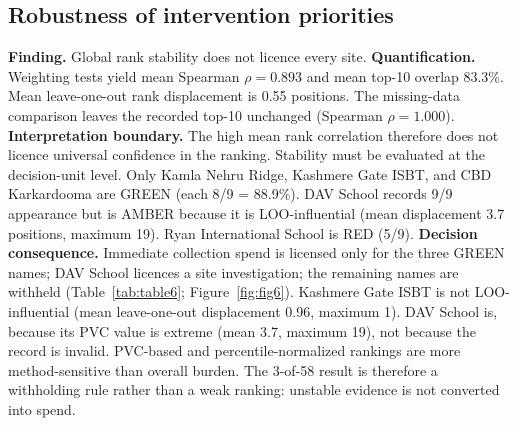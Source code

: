 \documentclass[12pt,a4paper]{article}
\begin{document}
\subsection{Robustness of intervention priorities}
\label{sec:res-robust}

\textbf{Finding.} Global rank stability does not licence every site. \textbf{Quantification.} Weighting tests yield mean Spearman $\rho=0.893$ and mean top-10 overlap 83.3\%. Mean leave-one-out rank displacement is 0.55 positions. The missing-data comparison leaves the recorded top-10 unchanged (Spearman $\rho=1.000$). \textbf{Interpretation boundary.} The high mean rank correlation therefore does not licence universal confidence in the ranking. Stability must be evaluated at the decision-unit level. Only Kamla Nehru Ridge, Kashmere Gate ISBT, and CBD Karkardooma are GREEN (each 8/9 = 88.9\%). DAV School records 9/9 appearance but is AMBER because it is LOO-influential (mean displacement 3.7 positions, maximum 19). Ryan International School is RED (5/9). \textbf{Decision consequence.} Immediate collection spend is licensed only for the three GREEN names; DAV School licences a site investigation; the remaining names are withheld (Table~\ref{tab:table6}; Figure~\ref{fig:fig6}). Kashmere Gate ISBT is not LOO-influential (mean leave-one-out displacement 0.96, maximum 1). DAV School is, because its PVC value is extreme (mean 3.7, maximum 19), not because the record is invalid. PVC-based and percentile-normalized rankings are more method-sensitive than overall burden. The 3-of-58 result is therefore a withholding rule rather than a weak ranking: unstable evidence is not converted into spend.
\end{document}
